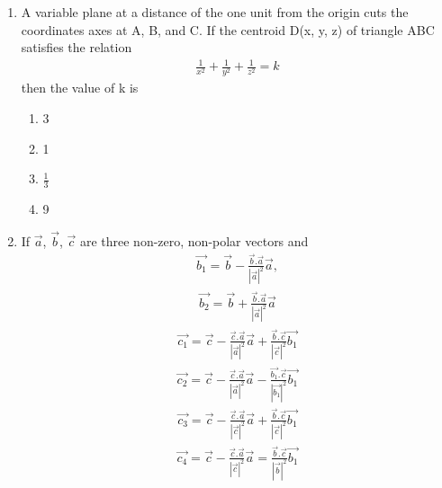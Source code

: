 \begin{enumerate}[label=\arabic*.,ref=\thesubsection.\theenumi]
\item A variable plane at a distance of the one unit from the origin cuts the coordinates axes at A, B, and C. If the centroid D(x, y, z) of triangle ABC satisfies the relation
\begin{align*}
\frac{1}{x^{2}} + \frac{1}{y^{2}} + \frac{1}{z^{2}} = k
\end{align*}
then the value of k is
\begin{enumerate}
\item 3
\item 1
\item $\frac{1}{3}$
\item 9
\end{enumerate}

\item If $\overrightarrow{a}$, $\overrightarrow{b}$, $\overrightarrow{c}$ are three non-zero, non-polar vectors and 
\begin{align*}
\overrightarrow{b_1} = \overrightarrow{b} - \frac{\overrightarrow{b}.\overrightarrow{a}}{|\overrightarrow{a}|^{2}}\overrightarrow{a},
\end{align*}
\begin{align*}
\overrightarrow{b_2} = \overrightarrow{b} + \frac{\overrightarrow{b}.\overrightarrow{a}}{|\overrightarrow{a}|^{2}}\overrightarrow{a} 
\end{align*}
\begin{align*}
\overrightarrow{c_1} = \overrightarrow{c} - \frac{\overrightarrow{c}.\overrightarrow{a}}{|\overrightarrow{a}|^{2}}\overrightarrow{a} + \frac{\overrightarrow{b}.\overrightarrow{c}}{|\overrightarrow{c}|^{2}}\overrightarrow{b_1}
\end{align*}
\begin{align*}
\overrightarrow{c_2} = \overrightarrow{c} - \frac{\overrightarrow{c}.\overrightarrow{a}}{|\overrightarrow{a}|^{2}}\overrightarrow{a} - \frac{\overrightarrow{b_1}.\overrightarrow{c}}{|\overrightarrow{b_1}|^{2}}\overrightarrow{b_1}
\end{align*}
\begin{align*}
\overrightarrow{c_3} = \overrightarrow{c} - \frac{\overrightarrow{c}.\overrightarrow{a}}{|\overrightarrow{c}|^{2}}\overrightarrow{a} + \frac{\overrightarrow{b}.\overrightarrow{c}}{|\overrightarrow{c}|^{2}}\overrightarrow{b_1}
\end{align*}
\begin{align*}
\overrightarrow{c_4} = \overrightarrow{c} - \frac{\overrightarrow{c}.\overrightarrow{a}}{|\overrightarrow{c}|^{2}}\overrightarrow{a} = \frac{\overrightarrow{b}.\overrightarrow{c}}{|\overrightarrow{b}|^{2}}\overrightarrow{b_1}

\end{align*}
\end{enumerate}
